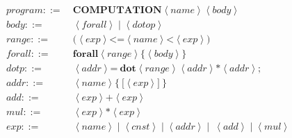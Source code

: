\begin{align*}
program ::=\ &\textbf{COMPUTATION} \left<name\right> \left<body\right>\\
body    ::=\ &\left<forall\right> \mid \left<dotop\right>\\
range   ::=\ &\textbf{(} \left<exp\right> \textbf{<=} \left<name\right> \textbf{<} \left<exp\right> \textbf{)}\\
forall ::=\ &\textbf{forall} \left<range\right> \textbf{\{} \left<body\right> \textbf{\}}\\
dotp    ::=\ &\left<addr\right> \textbf{=}\ \textbf{dot} \left<range\right> \left<addr\right> \textbf{*} \left<addr\right> \textbf{;}\\
addr    ::=\ &\left<name\right> \{\ \textbf{[} \left<exp\right> \textbf{]}\ \}\\
add     ::=\ &\left<exp\right> \textbf{+} \left<exp\right>\\
mul     ::=\ &\left<exp\right> \textbf{*} \left<exp\right>\\
exp     ::=\ &\left<name\right> \mid \left<cnst\right> \mid \left<addr\right> \mid\ \left<add\right> \mid \left<mul\right>
\end{align*}